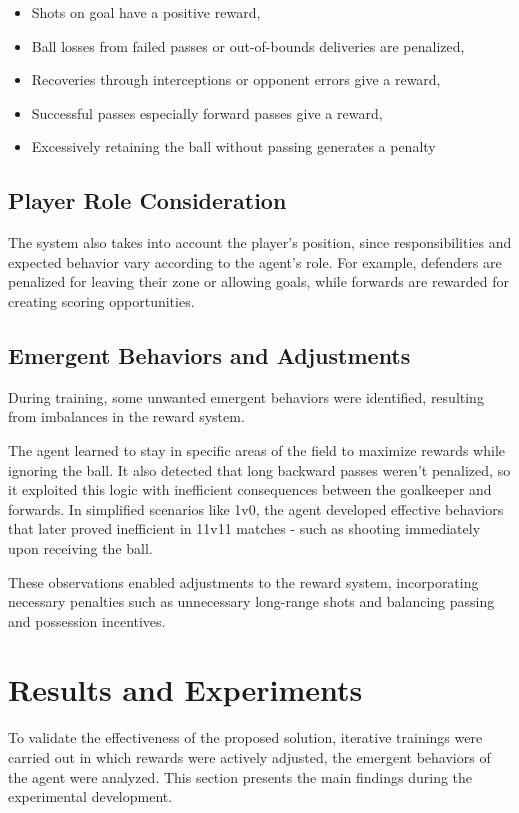 \documentclass[conference]{IEEEtran}
\begin{document}
\begin{itemize}
  \item Shots on goal have a positive reward,
  \item Ball losses from failed passes or out-of-bounds deliveries are penalized,
  \item Recoveries through interceptions or opponent errors give a reward,
  \item Successful passes especially forward passes give a reward,
  \item Excessively retaining the ball without passing generates a penalty
\end{itemize}

\subsection{Player Role Consideration}
The system also takes into account the player's position, since responsibilities and expected behavior vary according to the agent's role. For example, defenders are penalized for leaving their zone or allowing goals, while forwards are rewarded for creating scoring opportunities.

\subsection{Emergent Behaviors and Adjustments}
During training, some unwanted emergent behaviors were identified, resulting from imbalances in the reward system.

The agent learned to stay in specific areas of the field to maximize rewards while ignoring the ball. It also detected that long backward passes weren't penalized, so it exploited this logic with inefficient consequences between the goalkeeper and forwards. In simplified scenarios like 1v0, the agent developed effective behaviors that later proved inefficient in 11v11 matches - such as shooting immediately upon receiving the ball.

These observations enabled adjustments to the reward system, incorporating necessary penalties such as unnecessary long-range shots and balancing passing and possession incentives.

\section{Results and Experiments}
To validate the effectiveness of the proposed solution, iterative trainings were carried out in which rewards were actively adjusted, the emergent behaviors of the agent were analyzed. This section presents the main findings during the experimental development.
\end{document}
